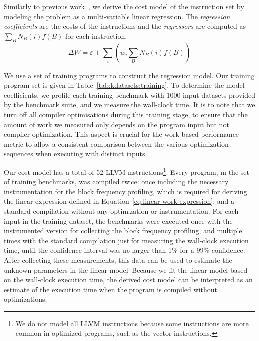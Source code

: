 Similarly to previous work~\citep{giusto01,powell09,brandolese11}, we derive the cost model of the instruction set by modeling the problem
as a multi-variable linear regression. The \textit{regression coefficients} are the costs of the instructions and the \textit{regressors}
are computed as $\sum_B N_B(i)f(B)$ for each instruction.
\begin{equation}\label{eq:linear-work-expression}
\Delta W = \varepsilon + \sum_{i} \left(w_i \sum_{B} N_B(i)f(B)\right)
\end{equation}

We use a set of training programs to construct the regression model. Our training program set is given in
Table~\ref{tab:kdatasets:training}. To determine the model coefficients, we profile each training benchmark with 1000 input datasets
provided by the benchmark suite, and we measure the wall-clock time. It is to note that we turn off all compiler optimisations during this
training stage, to ensure that the amount of work we measured only depends on the program input but not compiler optimization. This aspect
is crucial for the work-based performance metric to allow a consistent comparison between the various optimization sequences when executing
with distinct inputs.



Our cost model has a total of 52 LLVM instructions\footnote{We do not model all LLVM instructions because some instructions are more common in optimized programs, such as the vector instructions.}.
Every program, in the set of training benchmarks, was compiled twice: once including the necessary instrumentation for the block frequency profiling, which is required for deriving the linear expression defined in Equation~\ref{eq:linear-work-expression};
and a standard compilation without any optimization or instrumentation.
For each input in the training dataset, the benchmarks were executed once with the instrumented version for collecting the block frequency profiling, and multiple times with the standard compilation just for measuring the wall-clock execution time, until the confidence interval was no larger than 1\% for a 99\% confidence.
After collecting these measurements, this data can be used to estimate the unknown parameters in the linear model.
Because we fit the linear model based on the wall-clock execution time, the derived cost model can be interpreted as an estimate of the execution time when the program is compiled without optimizations.

